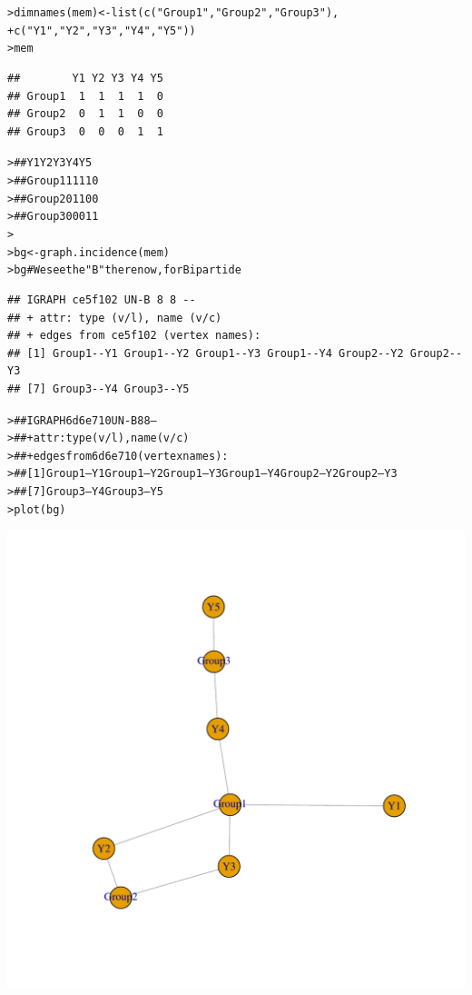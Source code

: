 \documentclass[12pt]{article}\usepackage[]{graphicx}\usepackage[]{color}
\makeatletter
\newcommand{\hlstr}[1]{\textcolor[rgb]{0.82,0.78,0.62}{#1}}%
\newcommand{\hlcom}[1]{\textcolor[rgb]{0.404,0.408,0.42}{#1}}%
\newcommand{\hlstd}[1]{\textcolor[rgb]{0.882,0.878,0.898}{#1}}%
\newcommand{\hlkwb}[1]{\textcolor[rgb]{0.902,0.675,0.196}{#1}}%
\newcommand{\hlkwd}[1]{\textcolor[rgb]{0.733,0.388,0.812}{#1}}%
\newenvironment{kframe}{%
 \def\at@end@of@kframe{}%
 \ifinner\ifhmode%
  \def\at@end@of@kframe{\end{minipage}}%
  \begin{minipage}{\columnwidth}%
 \fi\fi%
 \def\FrameCommand##1{\hskip\@totalleftmargin \hskip-\fboxsep
 \colorbox{shadecolor}{##1}\hskip-\fboxsep
     \hskip-\linewidth \hskip-\@totalleftmargin \hskip\columnwidth}%
 \MakeFramed {\advance\hsize-\width
   \@totalleftmargin\z@ \linewidth\hsize
   \@setminipage}}%
 {\par\unskip\endMakeFramed%
 \at@end@of@kframe}
\newenvironment{knitrout}{}{} %
\makeatother
\begin{document}
\begin{flushleft}
\begin{center}
\begin{knitrout}
\begin{kframe}
\begin{alltt}
\hlstd{> }\hlkwd{dimnames}\hlstd{(mem)} \hlkwb{<-} \hlkwd{list}\hlstd{(}\hlkwd{c}\hlstd{(}\hlstr{"Group1"}\hlstd{,}\hlstr{"Group2"}\hlstd{,}\hlstr{"Group3"}\hlstd{),}
\hlstd{+ }                      \hlkwd{c}\hlstd{(}\hlstr{"Y1"}\hlstd{,}\hlstr{"Y2"}\hlstd{,}\hlstr{"Y3"}\hlstd{,}\hlstr{"Y4"}\hlstd{,}\hlstr{"Y5"}\hlstd{))}
\hlstd{> }\hlstd{mem}
\end{alltt}
\begin{verbatim}
##        Y1 Y2 Y3 Y4 Y5
## Group1  1  1  1  1  0
## Group2  0  1  1  0  0
## Group3  0  0  0  1  1
\end{verbatim}
\begin{alltt}
\hlstd{> }\hlcom{##        Y1 Y2 Y3 Y4 Y5}
\hlstd{> }\hlcom{## Group1  1  1  1  1  0}
\hlstd{> }\hlcom{## Group2  0  1  1  0  0}
\hlstd{> }\hlcom{## Group3  0  0  0  1  1}
\hlstd{> }
\hlstd{> }\hlstd{bg} \hlkwb{<-} \hlkwd{graph.incidence}\hlstd{(mem)}
\hlstd{> }\hlstd{bg}  \hlcom{# We see the "B" there now, for Bipartide}
\end{alltt}
\begin{verbatim}
## IGRAPH ce5f102 UN-B 8 8 -- 
## + attr: type (v/l), name (v/c)
## + edges from ce5f102 (vertex names):
## [1] Group1--Y1 Group1--Y2 Group1--Y3 Group1--Y4 Group2--Y2 Group2--Y3
## [7] Group3--Y4 Group3--Y5
\end{verbatim}
\begin{alltt}
\hlstd{> }\hlcom{## IGRAPH 6d6e710 UN-B 8 8 --}
\hlstd{> }\hlcom{## + attr: type (v/l), name (v/c)}
\hlstd{> }\hlcom{## + edges from 6d6e710 (vertex names):}
\hlstd{> }\hlcom{## [1] Group1--Y1 Group1--Y2 Group1--Y3 Group1--Y4 Group2--Y2 Group2--Y3}
\hlstd{> }\hlcom{## [7] Group3--Y4 Group3--Y5}
\hlstd{> }\hlkwd{plot}\hlstd{(bg)}
\end{alltt}
\end{kframe}
\includegraphics[width=6in]{figure/Network_Basics-5} 

\end{knitrout}
\end{center}
\end{flushleft}
\end{document}
